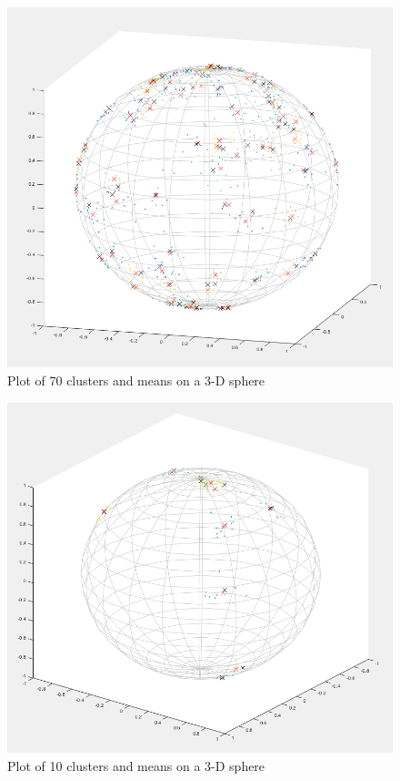 \documentclass[../tech_report_1.tex]{subfiles}
\begin{document}
\begin{figure}


\caption{Plot of 70 clusters and means on a 3-D sphere}


\includegraphics[width=1\textwidth]{sphere_points_70_clusters}
\end{figure}


\begin{figure}
\caption{Plot of 10 clusters and means on a 3-D sphere}


\includegraphics[width=1\textwidth]{sphere_points_10_clusters}
\end{figure}
\end{document}
